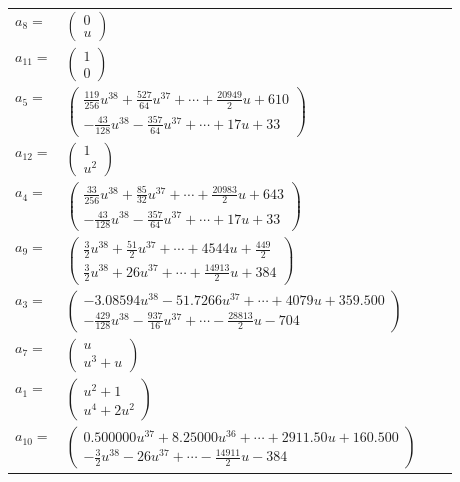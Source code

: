 \documentclass[1p]{elsarticle_modified}
\theoremstyle{definition}
\begin{document}
\begin{tabular}{m{7pt} m{180pt} m{7pt} m{180pt} }
\flushright $a_{8}=$&$\begin{pmatrix}0\\u\end{pmatrix}$ \\
\flushright $a_{11}=$&$\begin{pmatrix}1\\0\end{pmatrix}$ \\
\flushright $a_{5}=$&$\begin{pmatrix}\frac{119}{256} u^{38}+\frac{527}{64} u^{37}+\cdots+\frac{20949}{2} u+610\\-\frac{43}{128} u^{38}-\frac{357}{64} u^{37}+\cdots+17 u+33\end{pmatrix}$ \\
\flushright $a_{12}=$&$\begin{pmatrix}1\\u^2\end{pmatrix}$ \\
\flushright $a_{4}=$&$\begin{pmatrix}\frac{33}{256} u^{38}+\frac{85}{32} u^{37}+\cdots+\frac{20983}{2} u+643\\-\frac{43}{128} u^{38}-\frac{357}{64} u^{37}+\cdots+17 u+33\end{pmatrix}$ \\
\flushright $a_{9}=$&$\begin{pmatrix}\frac{3}{2} u^{38}+\frac{51}{2} u^{37}+\cdots+4544 u+\frac{449}{2}\\\frac{3}{2} u^{38}+26 u^{37}+\cdots+\frac{14913}{2} u+384\end{pmatrix}$ \\
\flushright $a_{3}=$&$\begin{pmatrix}-3.08594 u^{38}-51.7266 u^{37}+\cdots+4079 u+359.500\\-\frac{429}{128} u^{38}-\frac{937}{16} u^{37}+\cdots-\frac{28813}{2} u-704\end{pmatrix}$ \\
\flushright $a_{7}=$&$\begin{pmatrix}u\\u^3+u\end{pmatrix}$ \\
\flushright $a_{1}=$&$\begin{pmatrix}u^2+1\\u^4+2 u^2\end{pmatrix}$ \\
\flushright $a_{10}=$&$\begin{pmatrix}0.500000 u^{37}+8.25000 u^{36}+\cdots+2911.50 u+160.500\\-\frac{3}{2} u^{38}-26 u^{37}+\cdots-\frac{14911}{2} u-384\end{pmatrix}$ \\

\end{tabular}
\end{document}
